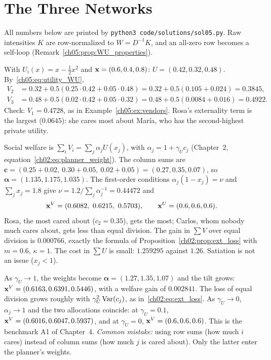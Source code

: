 \documentclass[../solutions_manual.tex]{subfiles}
\begin{document}
\ifSubfilesClassLoaded{\setcounter{chapter}{4}}{}%
\setcounter{chapter}{4}%
\chapter{The Three Networks}\label{sol05}
\sloppy

All numbers below are printed by \texttt{python3 code/solutions/sol05.py}. Raw intensities $K$ are row-normalized to $W = D^{-1}K$, and an all-zero row becomes a self-loop (Remark~\ref{ch05:prop:WU_properties}).


 With $U_i(x) = x - \frac12x^2$ and $\mathbf{x} = (0.6, 0.4, 0.8)$: $U = (0.42, 0.32, 0.48)$. By~\eqref{ch05:eq:utility_WU},
\begin{align*}
V_2 &= 0.32 + 0.5(0.25\cdot0.42 + 0.05\cdot0.48) = 0.32 + 0.5(0.105 + 0.024) = 0.3845,\\
V_3 &= 0.48 + 0.5(0.02\cdot0.42 + 0.05\cdot0.32) = 0.48 + 0.5(0.0084 + 0.016) = 0.4922 .
\end{align*}
Check: $V_1 = 0.4728$, as in Example~\ref{ch05:ex:vendors}. Rosa's externality term is the largest ($0.0645$): she cares most about Mar\'ia, who has the second-highest private utility.

 Social welfare is $\sum_iV_i = \sum_j\alpha_jU(x_j)$, with $\alpha_j = 1 + \gamma_Uc_j$ (Chapter~2, equation~\eqref{ch02:eq:planner_weight}). The column sums are $\mathbf c = (0.25 + 0.02,\ 0.30 + 0.05,\ 0.02 + 0.05) = (0.27, 0.35, 0.07)$, so $\boldsymbol\alpha = (1.135, 1.175, 1.035)$. The first-order conditions $\alpha_j(1 - x_j) = \nu$ and $\sum_jx_j = 1.8$ give $\nu = 1.2/\sum_j\alpha_j^{-1} = 0.44472$ and
\[
\mathbf{x}^{V} = (0.6082,\ 0.6215,\ 0.5703), \qquad \mathbf{x}^{U} = (0.6, 0.6, 0.6).
\]
Rosa, the most cared about ($c_2 = 0.35$), gets the most; Carlos, whom nobody much cares about, gets less than equal division. The gain in $\sum V$ over equal division is $0.000766$, exactly the formula of Proposition~\ref{ch02:prop:ext_loss} with $m = 0.6$, $\kappa = 1$. The cost in $\sum U$ is small: $1.259295$ against $1.26$. Satiation is not an issue ($x_j < 1$).

 As $\gamma_U \to 1$, the weights become $\boldsymbol\alpha = (1.27, 1.35, 1.07)$ and the tilt grows: $\mathbf{x}^V = (0.6163, 0.6391, 0.5446)$, with a welfare gain of $0.002841$. The loss of equal division grows roughly with $\gamma_U^2\operatorname{Var}(c_j)$, as in~\eqref{ch02:eq:ext_loss}. As $\gamma_U \to 0$, $\alpha_j \to 1$ and the two allocations coincide: at $\gamma_U = 0.1$, $\mathbf{x}^V = (0.6016, 0.6047, 0.5937)$, and at $\gamma_U = 0$, $\mathbf{x}^V = (0.6, 0.6, 0.6)$. This is the benchmark A1 of Chapter~4. \emph{Common mistake:} using row sums (how much $i$ cares) instead of column sums (how much $j$ is cared about). Only the latter enter the planner's weights.
\end{document}
